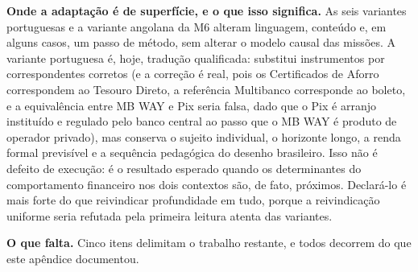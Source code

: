 \noindent\textbf{Onde a adaptação é de superfície, e o que isso significa.} As seis variantes portuguesas e a variante angolana da M6 alteram linguagem, conteúdo e, em alguns casos, um passo de método, sem alterar o modelo causal das missões. A variante portuguesa é, hoje, tradução qualificada: substitui instrumentos por correspondentes corretos (e a correção é real, pois os Certificados de Aforro correspondem ao Tesouro Direto, a referência Multibanco corresponde ao boleto, e a equivalência entre MB WAY e Pix seria falsa, dado que o Pix é arranjo instituído e regulado pelo banco central ao passo que o MB WAY é produto de operador privado), mas conserva o sujeito individual, o horizonte longo, a renda formal previsível e a sequência pedagógica do desenho brasileiro. Isso não é defeito de execução: é o resultado esperado quando os determinantes do comportamento financeiro nos dois contextos são, de fato, próximos. Declará-lo é mais forte do que reivindicar profundidade em tudo, porque a reivindicação uniforme seria refutada pela primeira leitura atenta das variantes.

\noindent\textbf{O que falta.} Cinco itens delimitam o trabalho restante, e todos decorrem do que este apêndice documentou.

